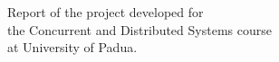 Report of the project developed for
\\
the Concurrent and Distributed Systems course
\\
at University of Padua.
